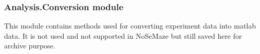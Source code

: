 \documentclass[letterpaper,10pt,english]{sphinxmanual}
\begin{document}
\begin{DUlineblock}{0em}
\item[] 
\end{DUlineblock}


\subsubsection{Analysis.Conversion module}
\label{\detokenize{NoSeMazeControl/Analysis:module-Analysis.Conversion}}\label{\detokenize{NoSeMazeControl/Analysis:analysis-conversion-module}}
\sphinxAtStartPar
This module contains methods used for converting experiment data into matlab
data. It is not used and not supported in NoSeMaze but still saved here for
archive purpose.
\end{document}
